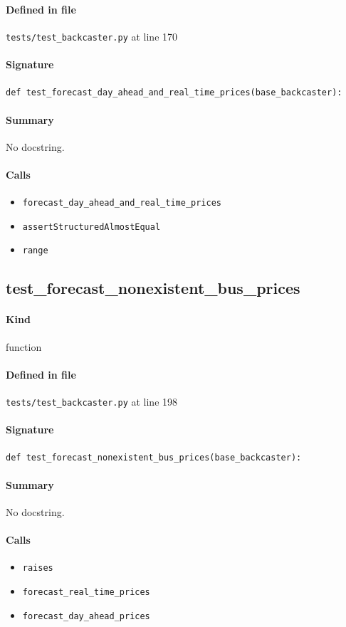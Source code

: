 \documentclass[11pt]{report}
\begin{document}
\paragraph{Defined in file} \texttt{tests/test\_backcaster.py} at line 170
\paragraph{Signature} \texttt{def test\_forecast\_day\_ahead\_and\_real\_time\_prices(base\_backcaster):}
\paragraph{Summary} No docstring.
\paragraph{Calls}
\begin{itemize}[leftmargin=*]
  \item \texttt{forecast\_day\_ahead\_and\_real\_time\_prices}
  \item \texttt{assertStructuredAlmostEqual}
  \item \texttt{range}
\end{itemize}
\subsection{test\_forecast\_nonexistent\_bus\_prices}
\label{def:tests-test_backcaster.py:test_forecast_nonexistent_bus_prices:L198}
\paragraph{Kind} function
\paragraph{Defined in file} \texttt{tests/test\_backcaster.py} at line 198
\paragraph{Signature} \texttt{def test\_forecast\_nonexistent\_bus\_prices(base\_backcaster):}
\paragraph{Summary} No docstring.
\paragraph{Calls}
\begin{itemize}[leftmargin=*]
  \item \texttt{raises}
  \item \texttt{forecast\_real\_time\_prices}
  \item \texttt{forecast\_day\_ahead\_prices}
\end{itemize}
\end{document}
